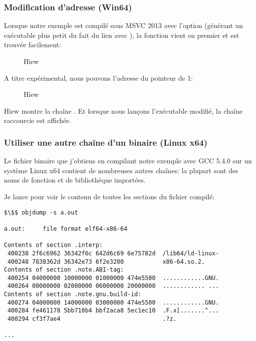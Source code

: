 ﻿\subsubsection{Modification d'adresse (Win64)}

Lorsque notre exemple est compilé sous MSVC 2013 avec l'option 
(générant un exécutable plus petit du fait du lien avec ), la fonction \main vient en premier et
est trouvée facilement:

\begin{figure}[H]
\centering
{}
\caption{Hiew}
\label{}
\end{figure}

A titre expérimental, nous pouvons  l'adresse du pointeur de 1:

\begin{figure}[H]
\centering
{}
\caption{Hiew}
\label{}
\end{figure}

Hiew montre la chaîne .
Et lorsque nous lançons l'exécutable modifié, la chaîne raccourcie est affichée.

\subsubsection{Utiliser une autre chaîne d'un binaire (Linux x64)}

Le fichier binaire que j'obtiens en compilant notre exemple avec GCC 5.4.0 sur un système Linux x64 contient de
nombreuses autres chaînes:
la plupart sont des noms de fonction et de bibliothèque importées.

Je lance  pour voir le contenu de toutes les sections du fichier compilé:

\begin{lstlisting}[basicstyle=\ttfamily, mathescape]
$\$$ objdump -s a.out

a.out:     file format elf64-x86-64

Contents of section .interp:
 400238 2f6c6962 36342f6c 642d6c69 6e75782d  /lib64/ld-linux-
 400248 7838362d 36342e73 6f2e3200           x86-64.so.2.
Contents of section .note.ABI-tag:
 400254 04000000 10000000 01000000 474e5500  ............GNU.
 400264 00000000 02000000 06000000 20000000  ............ ...
Contents of section .note.gnu.build-id:
 400274 04000000 14000000 03000000 474e5500  ............GNU.
 400284 fe461178 5bb710b4 bbf2aca8 5ec1ec10  .F.x[.......^...
 400294 cf3f7ae4                             .?z.

...
\end{lstlisting}

